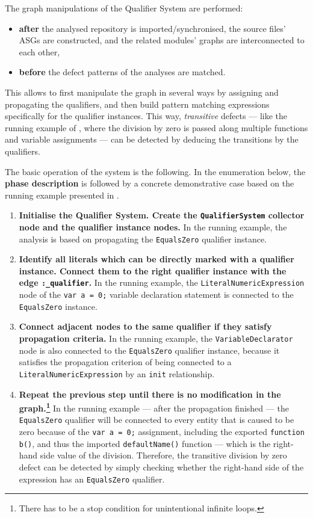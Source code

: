 The graph manipulations of the Qualifier System are performed:
\begin{itemize}
\item \textbf{after} the analysed repository is imported/synchronised, the source files' ASGs are constructed, and the related modules' graphs are interconnected to each other,
\item \textbf{before} the defect patterns of the analyses are matched.
\end{itemize}

This allows to first manipulate the graph in several ways by assigning and propagating the qualifiers, and then build pattern matching expressions specifically for the qualifier instances. This way, \emph{transitive} defects — like the running example of , where the division by zero is passed along multiple functions and variable assignments — can be detected by deducing the transitions by the qualifiers.

The basic operation of the system is the following. In the enumeration below, the \textbf{phase description} is followed by a concrete demonstrative case based on the running example presented in .

\begin{enumerate}
\item \textbf{Initialise the Qualifier System. Create the \lstinline{QualifierSystem} collector node and the qualifier instance nodes.} In the running example, the analysis is based on propagating the \lstinline{EqualsZero} qualifier instance.
\item \textbf{Identify all literals which can be directly marked with a qualifier instance. Connect them to the right qualifier instance with the edge \lstinline{:_qualifier}.} In the running example, the \lstinline{LiteralNumericExpression} node of the \lstinline{var a = 0;} variable declaration statement is connected to the \lstinline{EqualsZero} instance.
\item \textbf{Connect adjacent nodes to the same qualifier if they satisfy propagation criteria.} In the running example, the \lstinline{VariableDeclarator} node is also connected to the \lstinline{EqualsZero} qualifier instance, because it satisfies the propagation criterion of being connected to a \lstinline{LiteralNumericExpression} by an \lstinline{init} relationship.
\item \textbf{Repeat the previous step until there is no modification in the graph.\footnote{There has to be a stop condition for unintentional infinite loops.}} In the running example — after the propagation finished — the \lstinline{EqualsZero} qualifier will be connected to every entity that is caused to be zero because of the \lstinline{var a = 0;} assignment, including the exported \lstinline{function b()}, and thus the imported \lstinline{defaultName()} function — which is the right-hand side value of the division. Therefore, the transitive division by zero defect can be detected by simply checking whether the right-hand side of the expression has an \lstinline{EqualsZero} qualifier.
\end{enumerate}

